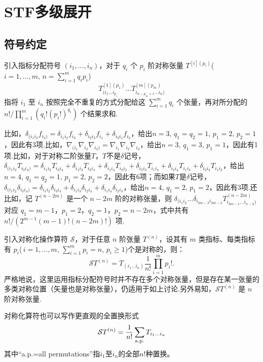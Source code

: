 
\section{STF多级展开}

\subsection{符号约定}

引入指标分配符号 \((i_1, \dots, i_n)\)，对于 \(q_i\) 个 \(p_i\) 阶对称张量 \(T^{[i](p_i)}\)(\(i=1,\dots,m,\,n=\sum_{i=1}^m q_i p_i \))
\begin{equation*}
	T^{[1](p_1)}_{(i_1 \dots i_{p_1}} \dots T^{[m](p_m)}_{i_{n-p_m+1} \dots i_n)}
\end{equation*}
指将 \(i_1\) 至 \(i_n\) 按照完全不重复的方式分配给这 \(\sum_{i=1}^m q_i\) 个张量，再对所分配的 \(n!/\prod_{i=1}^m (q_i! (p_i!)^{q_i})\) 个结果求和.

比如，\(\delta_{(i_1i_2}f_{i_3)}=\delta_{i_1i_2}f_{i_3}+\delta_{i_2i_3}f_{i_1}+\delta_{i_3i_1}f_{i_2}\)，给出\(n=3,\,q_1=q_2=1,\,p_1=2,\,p_2=1\)，因此有3项.比如，\(\nabla_{(i_1}\nabla_{i_2}\nabla_{i_3)}=\nabla_{i_1}\nabla_{i_2}\nabla_{i_3}\)，给出\(n=3,\,q_1=3,\,p_1=1\)，因此有1项.比如，对于对称二阶张量\(T\)，\(T\)不是\(\delta\)记号，\(\delta_{(i_1 i_2}T_{i_3 i_4)}=\delta_{i_1 i_2}T_{i_3 i_4}+\delta_{i_1 i_3}T_{i_2 i_4}+\delta_{i_1 i_4}T_{i_2 i_3}+\delta_{i_2 i_3}T_{i_1 i_4}+\delta_{i_2 i_4}T_{i_1 i_3}+\delta_{i_3 i_4}T_{i_1 i_2}\)，给出\(n=4,\,q_1=q_2=1,\,p_1=2,\,p_2=2\)，因此有6项；而如果\(T\)是\(\delta\)记号，\(\delta_{(i_1 i_2}\delta_{i_3 i_4)}=\delta_{i_1 i_2}\delta_{i_3 i_4}+\delta_{i_1 i_3}\delta_{i_2 i_4}+\delta_{i_1 i_4}\delta_{i_2 i_3}\)，给出\(n=4,\,q_1=2,\,p_1=2\)，因此有3项.还比如，记 \(T^{(n-2m)}\) 是一个 \(n-2m\) 阶的对称张量，则 \(\delta_{(i_1 i_2} \dots \delta_{i_{2m-3} i_{2m-2}} T^{(n-2m)}_{i_{2m-1} \dots i_{n-2})}\) 对应 \(q_1 = m-1\)，\(p_1 = 2\)，\(q_2 = 1\)，\(p_2 = n-2m\)，式中共有 \(n!/(2^{m-1} (m-1)! (n-2m)!)\) 项.

引入对称化操作算符 \(\mathcal{S}\)，对于任意 \(n\) 阶张量 \(T^{(n)}\)，设其有 \(m\) 类指标、每类指标有 \(p_i\)(\(\,i=1,\dots,m,\,\sum_{i=1}^mp_i=n,\,p_i\geq 1\))个是对称的，则：
\begin{equation*}
	\mathcal{S} T^{(n)} = T_{(i_1 \dots i_n)}\frac{1}{n!} \prod_{i=1}^m p_i!.
\end{equation*}
严格地说，这里运用指标分配符号时并不存在多个对称张量，但是存在某一张量的多类对称位置（矢量也是对称张量），仍适用于如上讨论.另外易知，\(\mathcal{S} T^{(n)}\) 是 \(n\) 阶对称张量.
\begin{notes}
	对称化算符也可以写作更直观的全置换形式
	\begin{equation*}
		\mathcal{S} T^{(n)} = \frac{1}{n!}\sum_{\rm a.p.} T_{i_1 \dots i_n}
	\end{equation*}
	其中“a.p.=all permutations”指\(i_1\)至\(i_n\)的全部\(n!\)种置换。
\end{notes}

